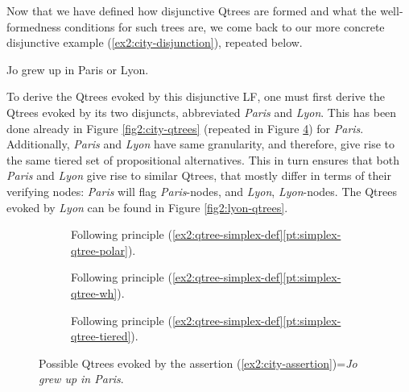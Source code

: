 Now that we have defined how disjunctive Qtrees are formed and what the well-formedness conditions for such trees are, we come back to our more concrete disjunctive example (\ref{ex2:city-disjunction}), repeated below. 

\begin{exe}
		 {Jo grew up in Paris or Lyon.}
\end{exe}

To derive the Qtrees evoked by this disjunctive LF, one must first derive the Qtrees evoked by its two disjuncts, abbreviated \textit{Paris} and \textit{Lyon}. This has been done already in Figure \ref{fig2:city-qtrees} (repeated in Figure \ref{fig2:paris-qtrees}) for \textit{Paris}. Additionally, \textit{Paris} and \textit{Lyon} have same granularity, and therefore, give rise to the same tiered set of propositional alternatives. This in turn ensures that both \textit{Paris} and \textit{Lyon} give rise to similar Qtrees, that mostly differ in terms of their verifying nodes: \textit{Paris} will flag \textit{Paris}-nodes, and \textit{Lyon}, \textit{Lyon}-nodes. The Qtrees evoked by \textit{Lyon} can be found in Figure \ref{fig2:lyon-qtrees}.

\begin{figure}[H]
	\centering
	\begin{subfigure}[t]{.23\linewidth}
		\centering
		\caption{Following principle (\ref{ex2:qtree-simplex-def}\ref{pt:simplex-qtree-polar}).}\label{fig2:paris-qtree-polar}
	\end{subfigure}
	\hfill
	\begin{subfigure}[t]{.33\linewidth}
		\centering		{}
		\caption{Following principle (\ref{ex2:qtree-simplex-def}\ref{pt:simplex-qtree-wh}).}\label{fig2:paris-qtree-wh}
	\end{subfigure}
	\hfill
	\begin{subfigure}[t]{.38\linewidth}
		\centering{}
		\caption{Following principle (\ref{ex2:qtree-simplex-def}\ref{pt:simplex-qtree-tiered}).}\label{fig2:paris-qtree-tiered}
	\end{subfigure}
	\caption{Possible Qtrees evoked by the assertion (\ref{ex2:city-assertion})=\textit{Jo grew up in Paris}.}\label{fig2:paris-qtrees}
\end{figure}

